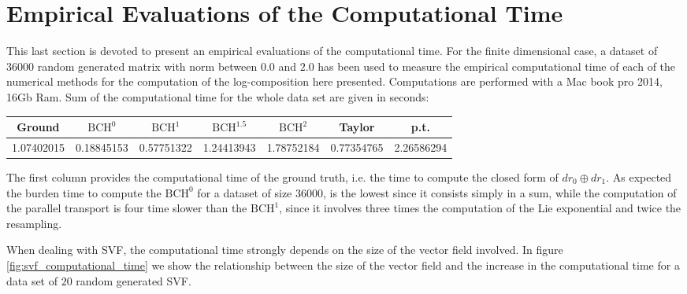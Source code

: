 \section{Empirical Evaluations of the Computational Time}

This last section is devoted to present an empirical evaluations of the computational time. 
For the finite dimensional case, a dataset of $36000$ random generated matrix with norm between $0.0$ and $2.0$ has been used to measure the empirical computational time of each of the numerical methods for the computation of the log-composition here presented. Computations are performed with a Mac book pro 2014, 16Gb Ram. Sum of the computational time for the whole data set are given in seconds:\\

\hspace{-1cm}
\begin{tabular}{ c | c | c | c | c | c | c }
Ground & $\text{BCH}^0$ & $\text{BCH}^1$ & $\text{BCH}^{1.5}$ & $\text{BCH}^2$ & Taylor & p.t. \\
\hline
1.07402015 & 0.18845153 & 0.57751322 & 1.24413943 & 1.78752184 & 0.77354765 &
2.26586294 
\end{tabular}
\vspace{0.5cm}

The first column provides the computational time of the ground truth, i.e. the time to compute the closed form of $dr_0 \oplus dr_{1}$. As expected the burden time to compute the $\text{BCH}^0$ for a dataset of size $36000$, is the lowest since it consists simply in a sum, while the computation of the parallel transport is four time slower than the $\text{BCH}^1$, since it involves three times the computation of the Lie exponential and twice the resampling.

When dealing with SVF, the computational time strongly depends on the size of the vector field involved. In figure \ref{fig:svf_computational_time} we show the relationship between the size of the vector field and the increase in the computational time for a data set of $20$ random generated SVF.








